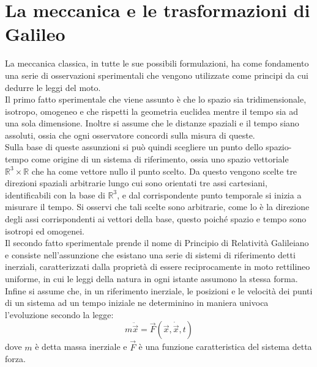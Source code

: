 \section{La meccanica e le trasformazioni di Galileo}
La meccanica classica, in tutte le sue possibili formulazioni, ha come fondamento una serie 
di osservazioni sperimentali che vengono utilizzate come principi da cui dedurre le leggi del moto.\\

Il primo fatto sperimentale che viene assunto è che lo spazio sia tridimensionale, isotropo, omogeneo e che rispetti la 
geometria euclidea mentre il tempo sia ad una sola dimensione. Inoltre si assume che le distanze spaziali e il tempo siano assoluti,
 ossia che ogni osservatore concordi sulla misura di queste.\\
Sulla base di queste assunzioni si può quindi scegliere un punto dello spazio-tempo come 
origine di un sistema di riferimento, ossia uno spazio vettoriale 
$\mathbb{R}^3\times\mathbb{R}$ che ha come vettore nullo il punto scelto. Da questo vengono scelte tre direzioni 
spaziali arbitrarie lungo cui sono orientati tre assi cartesiani, identificabili con la base di $\mathbb{R}^3$, e 
dal corrispondente punto temporale si inizia a misurare il tempo. Si osservi che tali scelte sono arbitrarie, 
come lo è la direzione degli assi corrispondenti ai vettori della base, questo poiché spazio e tempo sono isotropi 
ed omogenei.\\

Il secondo fatto sperimentale prende il nome di Principio di Relatività Galileiano e consiste 
nell'assunzione che esistano una serie di sistemi di riferimento detti inerziali, caratterizzati 
dalla proprietà di essere reciprocamente in moto rettilineo uniforme, in cui le leggi della natura 
in ogni istante assumono la stessa forma.\\

Infine si assume che, in un riferimento inerziale, le posizioni e le velocità dei punti di un sistema ad un tempo iniziale ne determinino 
in maniera univoca l'evoluzione secondo la legge:
\begin{equation}
	m\ddot{\vec{x}}=\vec{F}(\vec{x},\dot{\vec{x}},t)
	\label{equazioneDiNewton}
\end{equation}
dove $m$ è detta massa inerziale e $\vec{F}$ è una funzione caratteristica del sistema detta forza.\\

